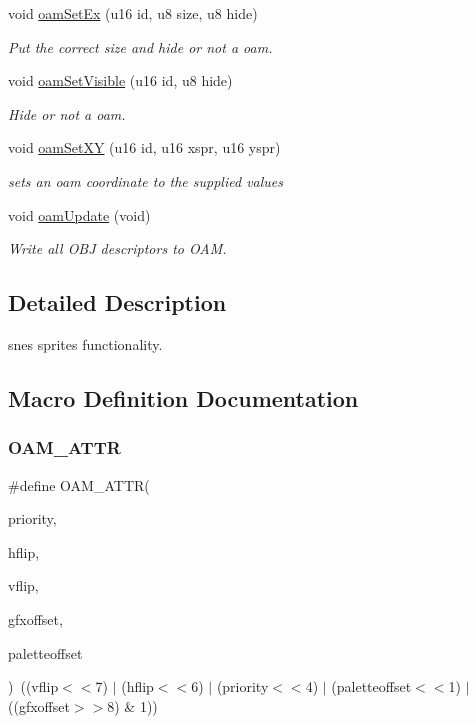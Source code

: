 \begin{DoxyCompactItemize}
void \hyperlink{a00350_a4120a8ff32c39973babeca3615a0a2fd}{oam\+Set\+Ex} (u16 id, u8 size, u8 hide)
\begin{DoxyCompactList}\small\item\em Put the correct size and hide or not a oam. \end{DoxyCompactList}\item 
void \hyperlink{a00350_a35a0da9852240ef41b5030ed21b6eeb2}{oam\+Set\+Visible} (u16 id, u8 hide)
\begin{DoxyCompactList}\small\item\em Hide or not a oam. \end{DoxyCompactList}\item 
void \hyperlink{a00350_a4b8ea6388961b74cc228104a97eaecbd}{oam\+Set\+XY} (u16 id, u16 xspr, u16 yspr)
\begin{DoxyCompactList}\small\item\em sets an oam coordinate to the supplied values \end{DoxyCompactList}\item 
\mbox{\label{a00350_a880416b4272104d4e9b83ea5331b6260}} 
void \hyperlink{a00350_a880416b4272104d4e9b83ea5331b6260}{oam\+Update} (void)
\begin{DoxyCompactList}\small\item\em Write all O\+BJ descriptors to O\+AM. \end{DoxyCompactList}\end{DoxyCompactItemize}


\subsection{Detailed Description}
snes sprites functionality. 



\subsection{Macro Definition Documentation}
\mbox{\label{a00350_a3e2d51ca1a0ddadfbb339450c70f4f2f}} 
\subsubsection{\texorpdfstring{O\+A\+M\+\_\+\+A\+T\+TR}{OAM\_ATTR}}
{\footnotesize\ttfamily \#define O\+A\+M\+\_\+\+A\+T\+TR(\begin{DoxyParamCaption}\item[{}]{priority,  }\item[{}]{hflip,  }\item[{}]{vflip,  }\item[{}]{gfxoffset,  }\item[{}]{paletteoffset }\end{DoxyParamCaption})~((vflip$<$$<$7) $\vert$ (hflip$<$$<$6) $\vert$ (priority$<$$<$4) $\vert$ (paletteoffset$<$$<$1) $\vert$ ((gfxoffset$>$$>$8) \& 1))}



